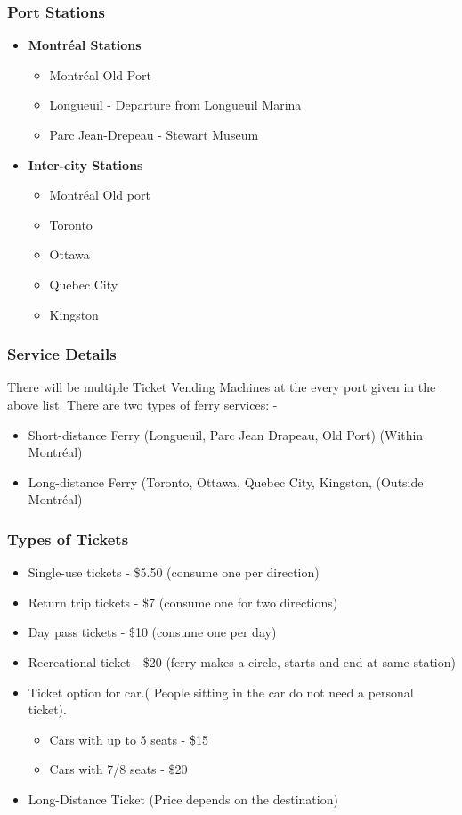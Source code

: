 \documentclass[letterpaper]{report}
\begin{document}
\subsubsection{Port Stations}
\begin{itemize}
    \item \textbf{Montréal Stations }
    \begin{itemize}
        \item Montréal Old Port 
        \item Longueuil - Departure from Longueuil Marina
        \item Parc Jean-Drepeau - Stewart Museum
    \end{itemize}
    \item \textbf{Inter-city Stations}
    \begin{itemize}
        \item Montréal Old port
        \item Toronto
        \item Ottawa
        \item Quebec City
        \item Kingston
    \end{itemize}
\end{itemize}

\subsubsection{Service Details}  
There will be multiple Ticket Vending Machines at the every port given in the above list. 
There are two types of ferry services: -
\begin{itemize}
    \item Short-distance Ferry (Longueuil, Parc Jean Drapeau, Old Port) (Within Montréal)
    \item Long-distance Ferry (Toronto, Ottawa, Quebec City, Kingston,  (Outside Montréal)
\end{itemize}
\subsubsection{Types of Tickets}
\begin{itemize}
    \item Single-use tickets - \$5.50 (consume one per direction)
    \item Return trip tickets - \$7 (consume one for two directions)
    \item Day pass tickets - \$10 (consume one per day)
    \item Recreational ticket - \$20 (ferry makes a circle, starts and end at same station)
    \item Ticket option for car.( People sitting in the car do not need a personal ticket). 
\begin{itemize}
    \item Cars with up to 5 seats - \$15
    \item Cars with 7/8  seats -  \$20
\end{itemize}
    \item Long-Distance Ticket (Price depends on the destination) 
\end{itemize}
\end{document}

